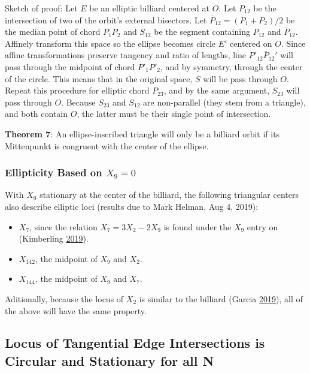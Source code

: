 \documentclass[]{article}
\providecommand{\tightlist}{%
  \setlength{\itemsep}{0pt}\setlength{\parskip}{0pt}}
\begin{document}
Sketch of proof: Let \(E\) be an elliptic billiard centered at \(O\). Let \(P_{12}\) be the intersection of two of the orbit's external bisectors. Let \(\bar{P}_{12}=(P_1+P_2)/2\) be the median point of chord \(P_1P_2\) and \(S_{12}\) be the segment containing \(P_{12}\) and \(\bar{P}_{12}\). Affinely transform this space so the ellipse becomes circle \(E'\) centered on \(O\). Since affine transformations preserve tangency and ratio of lengths, line \(P'_{12}\bar{P}_{12}'\) will pass through the midpoint of chord \(P'_1P'_2\), and by symmetry, through the center of the circle. This means that in the original space, \(S\) will be pass through \(O\). Repeat this procedure for elliptic chord \(P_{23}\), and by the same argument, \(S_{23}\) will pass through \(O\). Because \(S_{23}\) and \(S_{12}\) are non-parallel (they stem from a triangle), and both contain \(O\), the latter must be their single point of intersection.

\textbf{Theorem 7}: An ellipse-inscribed triangle will only be a billiard orbit if its Mittenpunkt is congruent with the center of the ellipse.

\hypertarget{ellipticity-based-on-x_90}{%
\subsubsection{\texorpdfstring{Ellipticity Based on \(X_9=0\)}{Ellipticity Based on X\_9=0}}\label{ellipticity-based-on-x_90}}

With \(X_9\) stationary at the center of the billiard, the following triangular centers also describe elliptic loci (results due to Mark Helman, Aug 4, 2019):

\begin{itemize}
\tightlist
\item
  \(X_7\), since the relation \(X_7=3X_2-2X_9\) is found under the \(X_9\) entry on (Kimberling \protect\hyperlink{ref-etc}{2019}).
\item
  \(X_{142}\), the midpoint of \(X_9\) and \(X_2\).
\item
  \(X_{144}\), the midpoint of \(X_9\) and \(X_7\).
\end{itemize}

Aditionally, because the locus of \(X_2\) is similar to the billiard (Garcia \protect\hyperlink{ref-ronaldo19}{2019}), all of the above will have the same property.

\hypertarget{locus-of-tangential-edge-intersections-is-circular-and-stationary-for-all-n}{%
\subsection{Locus of Tangential Edge Intersections is Circular and Stationary for all N}\label{locus-of-tangential-edge-intersections-is-circular-and-stationary-for-all-n}}
\end{document}
